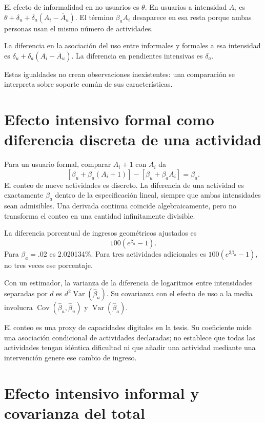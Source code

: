 \documentclass[11pt,a4paper]{article}
\DeclareMathOperator{\Var}{Var}
\DeclareMathOperator{\Cov}{Cov}
\begin{document}
El efecto de informalidad en no usuarios es $\theta$. En usuarios a intensidad $A_i$ es
$\theta+\delta_u+\delta_a(A_i-\overline A_u)$.
El término $\beta_aA_i$ desaparece en esa resta porque ambas personas usan el mismo número de actividades.

La diferencia en la asociación del uso entre informales y formales a esa intensidad es
$\delta_u+\delta_a(A_i-\overline A_u)$.
La diferencia en pendientes intensivas es $\delta_a$.

Estas igualdades no crean observaciones inexistentes: una comparación se interpreta sobre soporte común de sus características.

\clearpage
\section{Efecto intensivo formal como diferencia discreta de una actividad}

Para un usuario formal, comparar $A_i+1$ con $A_i$ da
\[
[\beta_u+\beta_a(A_i+1)]-[\beta_u+\beta_aA_i]=\beta_a.
\]
El conteo de nueve actividades es discreto. La diferencia de una actividad es exactamente $\beta_a$ dentro de la especificación lineal, siempre que ambas intensidades sean admisibles. Una derivada continua coincide algebraicamente, pero no transforma el conteo en una cantidad infinitamente divisible.

La diferencia porcentual de ingresos geométricos ajustados es
\[
100(e^{\beta_a}-1).
\]
Para $\beta_a=.02$ es 2.020134\%. Para tres actividades adicionales es $100(e^{3\beta_a}-1)$, no tres veces ese porcentaje.

Con un estimador, la varianza de la diferencia de logaritmos entre intensidades separadas por $d$ es
$d^2\Var(\widehat\beta_a)$. Su covarianza con el efecto de uso a la media involucra $\Cov(\widehat\beta_a,\widehat\beta_u)$ y $\Var(\widehat\beta_a)$.

El conteo es una proxy de capacidades digitales en la tesis. Su coeficiente mide una asociación condicional de actividades declaradas; no establece que todas las actividades tengan idéntica dificultad ni que añadir una actividad mediante una intervención genere ese cambio de ingreso.

\clearpage
\section{Efecto intensivo informal y covarianza del total}
\end{document}
